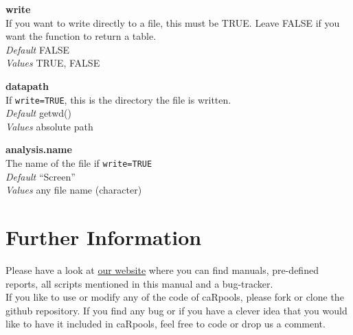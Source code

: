 \documentclass[]{article}
\begin{document}
\textbf{write}\\
If you want to write directly to a file, this must be TRUE. Leave FALSE
if you want the function to return a table.\\
\emph{Default} FALSE\\
\emph{Values} TRUE, FALSE

\textbf{datapath}\\
If \texttt{write=TRUE}, this is the directory the file is written.\\
\emph{Default} getwd()\\
\emph{Values} absolute path

\textbf{analysis.name}\\
The name of the file if \texttt{write=TRUE}\\
\emph{Default} ``Screen''\\
\emph{Values} any file name (character)

\section{Further Information}\label{further-information}

Please have a look at \href{http://www.crispr-analyzer.de}{our website}
where you can find manuals, pre-defined reports, all scripts mentioned
in this manual and a bug-tracker.\\
If you like to use or modify any of the code of caRpools, please fork or
clone the github repository. If you find any bug or if you have a clever
idea that you would like to have it included in caRpools, feel free to
code or drop us a comment.
\end{document}
